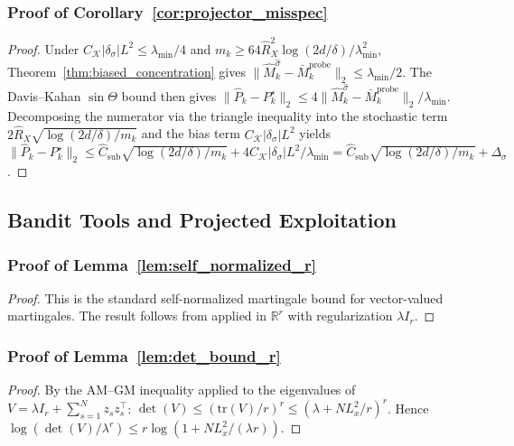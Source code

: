 \documentclass{article}
\newcommand{\R}{\mathbb{R}}
\newcommand{\tr}{\mathrm{tr}}
\begin{document}
\subsubsection{Proof of Corollary~\ref{cor:projector_misspec}}
\label{proof:projector_misspec}

\begin{proof}
Under $C_{\mathcal K}|\delta_\sigma|L^2 \le \lambda_{\min}/4$ and $m_k \ge 64\hat R_X^2\log(2d/\delta)/\lambda_{\min}^2$, Theorem~\ref{thm:biased_concentration} gives $\|\widehat M_k^{\hat\sigma} - \bar M_k^{\mathrm{probe}}\|_2 \le \lambda_{\min}/2$.
The Davis--Kahan $\sin\Theta$ bound then gives $\|\widehat P_k - P_k^\star\|_2 \le 4\|\widehat M_k^{\hat\sigma} - \bar M_k^{\mathrm{probe}}\|_2/\lambda_{\min}$.
Decomposing the numerator via the triangle inequality into the stochastic term $2\hat R_X\sqrt{\log(2d/\delta)/m_k}$ and the bias term $C_{\mathcal K}|\delta_\sigma|L^2$ yields
$\|\widehat P_k - P_k^\star\|_2 \le \hat C_{\mathrm{sub}}\sqrt{\log(2d/\delta)/m_k} + 4C_{\mathcal K}|\delta_\sigma|L^2/\lambda_{\min} = \hat C_{\mathrm{sub}}\sqrt{\log(2d/\delta)/m_k} + \Delta_\sigma$.
\end{proof}

\subsection{Bandit Tools and Projected Exploitation}

\subsubsection{Proof of Lemma~\ref{lem:self_normalized_r}}
\label{proof:self_normalized_r}

\begin{proof}
This is the standard self-normalized martingale bound for vector-valued martingales.
The result follows from \citet[Theorem~1]{abbasi2011improved} applied in $\R^r$ with regularization $\lambda I_r$.
\end{proof}

\subsubsection{Proof of Lemma~\ref{lem:det_bound_r}}
\label{proof:det_bound_r}

\begin{proof}
By the AM--GM inequality applied to the eigenvalues of $V = \lambda I_r + \sum_{s=1}^N z_s z_s^\top$:
$\det(V) \le (\tr(V)/r)^r \le (\lambda + N L_x^2/r)^r$.
Hence $\log(\det(V)/\lambda^r) \le r\log(1 + N L_x^2/(\lambda r))$.
\end{proof}
\end{document}
